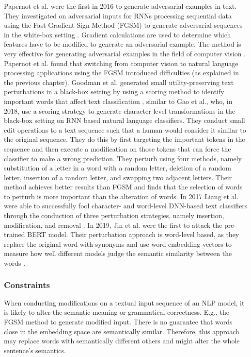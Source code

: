     Papernot et al. were the first in 2016 to generate adversarial examples in text. They investigated on adversarial inputs for RNNs processing sequential data using the Fast Gradient Sign Method (FGSM) to generate adversarial sequences in the white-box setting \cite{papernot2016crafting}. 
    Gradient calculations are used to determine which features have to be modified to generate an adversarial example. The method is very effective for generating adversarial examples in the field of computer vision \cite{goodfellow2014explaining}.
    Papernot et al. found that switching from computer vision to natural language processing applications using the FGSM introduced difficulties (as explained in the previous chapter). 
    Goodman et al. generated small utility-preserving text perturbations in a black-box setting by using a scoring method to identify important words that affect text classification \cite{goodman2020fastwordbug}, similar to Gao et al., who, in 2018, use a scoring strategy to generate character-level transformations in the black-box setting on RNN based natural language classifiers. They conduct small edit operations to a text sequence such that a human would consider it similar to the original sequence. They do this by first targeting the important tokens in the sequence and then execute a modification on those tokens that can force the classifier to make a wrong prediction. They perturb using four methods, namely substitution of a letter in a word with a random letter, deletion of a random letter, insertion of a random letter, and swapping two adjacent letters. Their method achieves better results than FGSM  and finds that the selection of words to perturb is more important than the alteration of words\cite{gao2018black}.  In 2017 Liang et al. were able to successfully fool character- and word-level DNN-based text classifiers through the conduction of three perturbation strategies, namely insertion, modification, and removal \cite{liang2017deep}. In 2019, Jin et al. were the first to attack the pre-trained BERT model. Their perturbation approach is word-level based, as they replace the original word with synonyms and use word embedding vectors to measure how well different models judge the semantic similarity between the words \cite{jin2019bert}.
    
    
\subsubsection{Constraints}
\label{sec:constraints}
    When conducting modifications on a textual input sequence of an NLP model, it is likely to alter the semantic meaning or grammatical correctness. E.g.,  the FGSM method to generate modified input. There is no guarantee that words close in the embedding space are semantically similar. Therefore, this approach may replace words with semantically different others and might alter the whole sentence's semantics.
    
